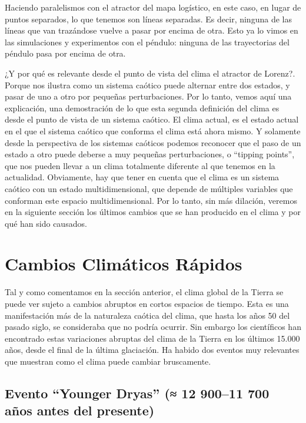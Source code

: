\documentclass[
  10pt,
  a4paper,
  DIV=11,
  numbers=noendperiod,
  open=any]{scrreprt}
\numberwithin{equation}{chapter}
\numberwithin{equation}{section}
\renewcommand{\[}{\begin{equation}}
\renewcommand{\]}{\end{equation}}
\begin{document}
Haciendo paralelismos con el atractor del mapa logístico, en este caso,
en lugar de puntos separados, lo que tenemos son líneas separadas. Es
decir, ninguna de las líneas que van trazándose vuelve a pasar por
encima de otra. Esto ya lo vimos en las simulaciones y experimentos con
el péndulo: ninguna de las trayectorias del péndulo pasa por encima de
otra.

¿Y por qué es relevante desde el punto de vista del clima el atractor de
Lorenz?. Porque nos ilustra como un sistema caótico puede alternar entre
dos estados, y pasar de uno a otro por pequeñas perturbaciones. Por lo
tanto, vemos aquí una explicación, una demostración de lo que esta
segunda definición del clima es desde el punto de vista de un sistema
caótico. El clima actual, es el estado actual en el que el sistema
caótico que conforma el clima está ahora mismo. Y solamente desde la
perspectiva de los sistemas caóticos podemos reconocer que el paso de un
estado a otro puede deberse a muy pequeñas perturbaciones, o ``tipping
points'', que nos pueden llevar a un clima totalmente diferente al que
tenemos en la actualidad. Obviamente, hay que tener en cuenta que el
clima es un sistema caótico con un estado multidimensional, que depende
de múltiples variables que conforman este espacio multidimensional. Por
lo tanto, sin más dilación, veremos en la siguiente sección los últimos
cambios que se han producido en el clima y por qué han sido causados.

\chapter{Cambios Climáticos
Rápidos}\label{cambios-climuxe1ticos-ruxe1pidos}

Tal y como comentamos en la sección anterior, el clima global de la
Tierra se puede ver sujeto a cambios abruptos en cortos espacios de
tiempo. Esta es una manifestación más de la naturaleza caótica del
clima, que hasta los años 50 del pasado siglo, se consideraba que no
podría ocurrir. Sin embargo los científicos han encontrado estas
variaciones abruptas del clima de la Tierra en los últimos 15.000 años,
desde el final de la última glaciación. Ha habido dos eventos muy
relevantes que muestran como el clima puede cambiar bruscamente.

\section{Evento ``Younger Dryas'' (≈ 12 900--11 700 años antes del
presente)}\label{evento-younger-dryas-12-90011-700-auxf1os-antes-del-presente}
\end{document}

